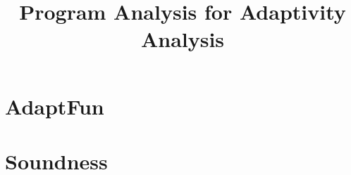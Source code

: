 \documentclass[a4paper,11pt]{article}
\newcommand{\THESYSTEM}{\textsf{AdaptFun}}
\begin{document}
\title{Program Analysis for Adaptivity Analysis}

\author{}

\date{}

\maketitle
%
% 
% 
% 
% 
% 
% 
\section{\THESYSTEM}


\clearpage

\section{Soundness}


\clearpage


\end{document}
